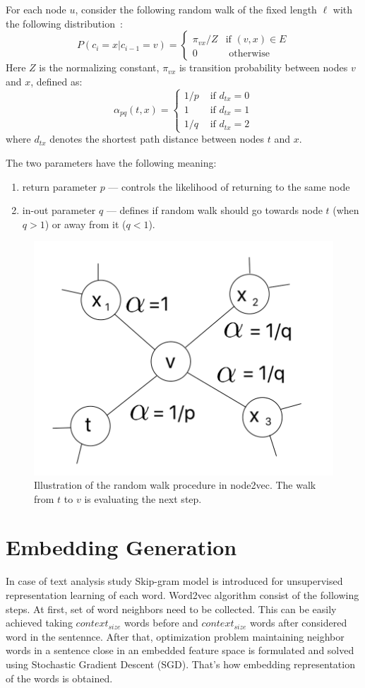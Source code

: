 For each node $u$, consider the following random walk of the fixed length $\ell$ with the following distribution~\cite{DBLP:journals/corr/abs-1011-4071}:
\begin{equation*}
P(c_i = x|c_{i-1} = v) =
 \begin{cases}
   \pi_{vx}/Z &\text{if $(v,x)\in E$}\\
   0 &\text{ otherwise}
 \end{cases}
\end{equation*}
Here $Z$ is the normalizing constant, $\pi_{vx}$ is transition probability between nodes $v$ and $x$, defined as: 
\[ 
  \alpha _{pq}(t, x) = \begin{cases}
   1/p &\text{ if $d_{tx} = 0$}\\
   1   &\text{ if $d_{tx} = 1$}\\
   1/q &\text{ if $d_{tx} = 2$}
   \end{cases}
\]
where $d_{tx}$ denotes the shortest path distance between nodes $t$ and $x$.


The two parameters have the following meaning:

\begin{enumerate}
    \item return parameter $p$ --- controls the likelihood of returning to the same node
    \item in-out parameter $q$ --- defines if random walk should go towards node $t$ (when $q > 1$) or away from it ($q < 1$).
\end{enumerate}

\begin{figure}[H]   \centering
    \includegraphics[width=0.5\linewidth]{plots/image2.png}
    \caption{Illustration   of   the   random   walk   procedure in node2vec. The walk from $t$ to $v$ is evaluating the next step.}
    \label{fig:my_label3}
\end{figure}

\section{Embedding Generation}
In case of text analysis study\cite{mikolov2013efficient} Skip-gram model is introduced for unsupervised representation learning of each word. Word2vec algorithm consist of the following steps. At first, set of word neighbors need to be collected. This can be easily achieved taking $context_{size}$ words before and $context_{size}$ words after considered word in the sentennce. After that, optimization problem maintaining neighbor words in a sentence close in an embedded feature space is formulated and solved using Stochastic Gradient Descent (SGD). That's how embedding representation of the words is obtained. 

